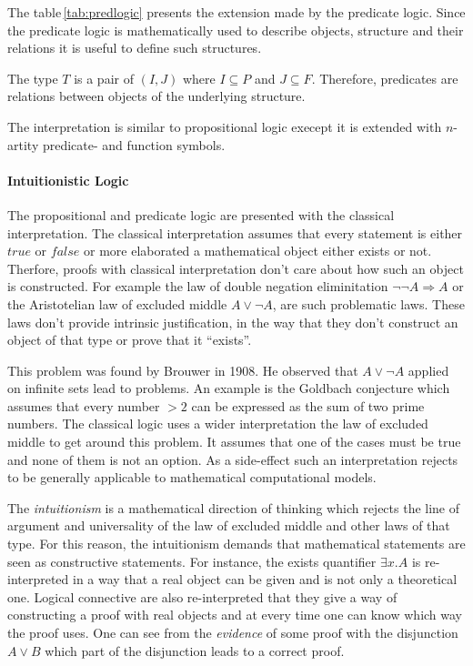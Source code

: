 The table\,\ref{tab:predlogic} presents the extension made by the predicate logic.
Since the predicate logic is mathematically used to describe objects,
structure and their relations it is useful to define such structures.~\cite{heinemann2013logik}

\begin{defi}
  The type $T$ is a pair of $(I,J)$ where $I\subseteq P$ and $J\subseteq F$.
  Therefore, predicates are relations between objects of the underlying
  structure.
\end{defi}

The interpretation is similar to propositional logic execept it is
extended with $n$-artity predicate- and function symbols.~\cite{heinemann2013logik}

\paragraph{Intuitionistic Logic}
The propositional and predicate logic are presented with the classical
interpretation. The classical interpretation assumes that every statement
is either $true$ or $false$ or more elaborated a mathematical object either
exists or not. Therfore, proofs with classical interpretation don't care
about how such an object is constructed. For example the law of double
negation eliminitation  $\neg\neg A\Rightarrow A$ or the Aristotelian law of excluded
middle $A \vee \neg A$, are such problematic laws. These laws don't provide
intrinsic justification, in the way that they don't construct an object
of that type or prove that it ``exists''.~\cite{sep-logic-intuitionistic, kreitz1994automatisierte}

This problem was found by Brouwer in 1908. He observed that $A \vee \neg A$
applied on infinite sets lead to problems. An example is the Goldbach
conjecture which assumes that every number $> 2$ can be expressed as the
sum of two prime numbers. The classical logic uses a wider interpretation
the law of excluded middle to get around this problem. It assumes
that one of the cases must be true and none of them is not an option.
As a side-effect such an interpretation rejects to be generally
applicable to mathematical computational models.~\cite{sep-logic-intuitionistic, sep-mathematics-constructive}

The \textit{intuitionism} is a mathematical direction of thinking which
rejects the line of argument and universality of the law of excluded middle
and other laws of that type. For this reason, the intuitionism demands
that mathematical statements are seen as constructive statements.
For instance, the exists quantifier $\exists x.A$ is re-interpreted in a way
that a real object can be given and is not only a theoretical one.
Logical connective are also re-interpreted that they give a way
of constructing a proof with real objects and at every time one can
know which way the proof uses. One can see from the \textit{evidence}
of some proof with the disjunction $A\vee B$ which part of the disjunction
leads to a correct proof.~\cite{kreitz1994automatisierte}

